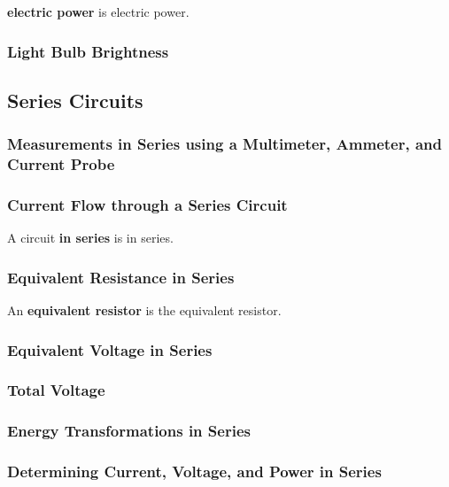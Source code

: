 \documentclass[dvipsnames]{article}
\begin{document}
\textbf{\Gls{electric power}} is \glsdesc{electric power}.

\subsubsection{Light Bulb Brightness}

\subsection{Series Circuits}

\subsubsection{Measurements in Series using a Multimeter, Ammeter, and Current Probe}

\subsubsection{Current Flow through a Series Circuit}

A circuit \textbf{\gls{in series}} is \glsdesc{in series}.

\subsubsection{Equivalent Resistance in Series}

An \textbf{\gls{equivalent resistor}} is the \glsdesc{equivalent resistor}.

\subsubsection{Equivalent Voltage in Series}

\subsubsection{Total Voltage}

\subsubsection{Energy Transformations in Series}

\subsubsection{Determining Current, Voltage, and Power in Series}

\clearpage
\end{document}
